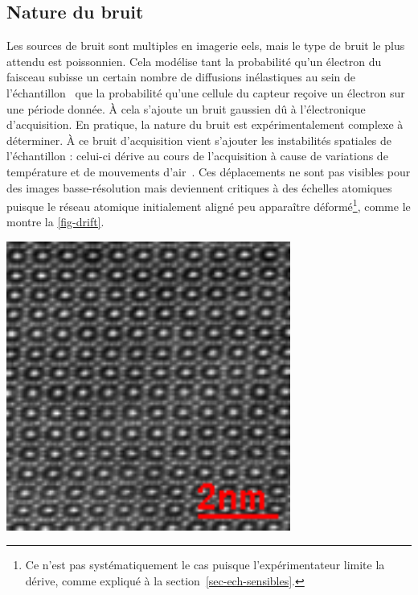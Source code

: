     \subsection{Nature du bruit}\label{sec-nature-bruit}
    
    Les sources de bruit sont multiples en imagerie \gls{eels}, mais le type de bruit le plus attendu est poissonnien. Cela modélise tant la probabilité qu'un électron du faisceau subisse un certain nombre de diffusions inélastiques au sein de l'échantillon~\cite[Section~4.1.1]{egerton2011electron} que la probabilité qu'une cellule du capteur reçoive un électron sur une période donnée. \`A cela s'ajoute un bruit gaussien dû à l'électronique d'acquisition.
    En pratique, la nature du bruit est expérimentalement complexe à déterminer.
    \`A ce bruit d'acquisition vient s'ajouter les instabilités spatiales de l'échantillon : celui-ci dérive au cours de l'acquisition à cause de variations de température et de mouvements d'air~\cite{zobelli2019spatial}. Ces déplacements ne sont pas visibles pour des images basse-résolution mais deviennent critiques à des échelles atomiques puisque le réseau atomique initialement aligné peu apparaître déformé\footnote{Ce n'est pas systématiquement le cas puisque l'expérimentateur limite la dérive, comme expliqué à la section~\ref{sec-ech-sensibles}.}, comme le montre la \cref{fig-drift}.
    
    \begin{marginfigure}[5\baselineskip]
        \centering
        \includegraphics[width=0.7\textwidth]{img/chapitre1/figure7/drift-sc.png}
        \caption{Un exemple de défaut en haute résolution : la dérive de l'échantillon. L'échantillonnage se fait ligne par ligne. On observe que, dans ce cas, l'échantillon dérive sur la gauche, puis vers le haut. Il en résulte une déformation notable et préjudiciable du réseau atomique.
            \protect\label{fig-drift}}
    \end{marginfigure}

